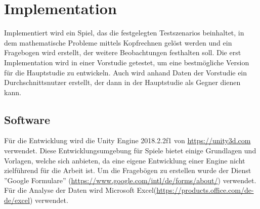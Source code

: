 \section{Implementation}
Implementiert wird ein Spiel, das die festgelegten Testszenarios beinhaltet,  in dem mathematische Probleme mittels Kopfrechnen gelöst werden und ein Fragebogen wird erstellt, der weitere Beobachtungen festhalten soll. Die erst Implementation wird in einer Vorstudie getestet, um eine bestmögliche Version für die Hauptstudie zu entwickeln. Auch wird anhand Daten der Vorstudie ein Durchschnittsnutzer erstellt, der dann in der Hauptstudie als Gegner dienen kann.

\subsection{Software}
Für die Entwicklung wird die Unity Engine 2018.2.2f1 von \url{https://unity3d.com} verwendet. Diese Entwicklungsumgebung für Spiele bietet einige Grundlagen und Vorlagen, welche sich anbieten, da eine eigene Entwicklung einer Engine nicht zielführend für die Arbeit ist.  Um die Fragebögen zu erstellen wurde der Dienst ''Google Formulare'' (\url{https://www.google.com/intl/de/forms/about/}) verwendet. Für die Analyse der Daten wird Microsoft Excel(\url{https://products.office.com/de-de/excel}) verwendet.

